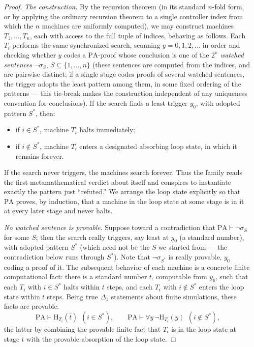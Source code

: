 \documentclass[11pt]{amsart}
\theoremstyle{definition}
\theoremstyle{remark}
\newcommand{\PA}{\mathrm{PA}}
\newcommand{\HT}[1]{\mathrm{H}_{#1}}
\begin{document}
\begin{proof}
\emph{The construction.} By the recursion theorem (in its standard
$n$-fold form, or by applying the ordinary recursion theorem to a single
controller index from which the $n$ machines are uniformly computed), we
may construct machines $T_1,\dots,T_n$, each with access to the full
tuple of indices, behaving as follows. Each $T_i$ performs the same
synchronized search, scanning $y=0,1,2,\dots$ in order and checking
whether $y$ codes a $\PA$-proof whose conclusion is one of the $2^n$
\emph{watched sentences} $\neg\sigma_S$, $S\subseteq\{1,\dots,n\}$
(these sentences are computed from the indices, and are pairwise
distinct; if a single stage codes proofs of several watched sentences,
the trigger adopts the least pattern among them, in some fixed ordering
of the patterns --- this tie-break makes the construction independent of
any uniqueness convention for conclusions). If the search finds a least
trigger $y_0$, with adopted pattern $S^*$, then:
\begin{itemize}
\item if $i\in S^*$, machine $T_i$ halts immediately;
\item if $i\notin S^*$, machine $T_i$ enters a designated absorbing loop
state, in which it remains forever.
\end{itemize}
If the search never triggers, the machines search forever. Thus the
family reads the first metamathematical verdict about itself and
conspires to instantiate exactly the pattern just ``refuted.'' We arrange
the loop state explicitly so that $\PA$ proves, by induction, that a
machine in the loop state at some stage is in it at every later stage
and never halts.

\emph{No watched sentence is provable.} Suppose toward a contradiction
that $\PA\vdash\neg\sigma_{S}$ for some $S$; then the search really
triggers, say least at $y_0$ (a standard number), with adopted pattern
$S^*$ (which need not be the $S$ we started from --- the contradiction
below runs through $S^*$). Note that $\neg\sigma_{S^*}$ is really
provable, $y_0$ coding a proof of it. The subsequent
behavior of each machine is a concrete finite computational fact: there
is a standard number $t$, computable from $y_0$, such that each $T_i$
with $i\in S^*$ halts within $t$ steps, and each $T_i$ with $i\notin S^*$
enters the loop state within $t$ steps. Being true $\Delta_1$ statements
about finite simulations, these facts are provable:
\[
\PA\vdash\HT{T_i}(\bar t)\ \ (i\in S^*),
\qquad
\PA\vdash\forall y\,\neg\HT{T_i}(y)\ \ (i\notin S^*),
\]
the latter by combining the provable finite fact that $T_i$ is in the
loop state at stage $\bar t$ with the provable absorption of the loop
state.


\end{proof}
\end{document}

